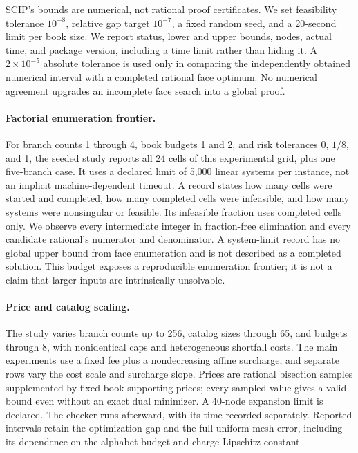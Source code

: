 SCIP's bounds are numerical, not rational proof certificates. We set feasibility tolerance $10^{-8}$, relative gap target $10^{-7}$, a fixed random seed, and a 20-second limit per book size. We report status, lower and upper bounds, nodes, actual time, and package version, including a time limit rather than hiding it. A $2\times10^{-5}$ absolute tolerance is used only in comparing the independently obtained numerical interval with a completed rational face optimum. No numerical agreement upgrades an incomplete face search into a global proof.

\paragraph{Factorial enumeration frontier.}
For branch counts 1 through 4, book budgets 1 and 2, and risk tolerances 0, $1/8$, and 1, the seeded study reports all 24 cells of this experimental grid, plus one five-branch case. It uses a declared limit of 5,000 linear systems per instance, not an implicit machine-dependent timeout. A record states how many cells were started and completed, how many completed cells were infeasible, and how many systems were nonsingular or feasible. Its infeasible fraction uses completed cells only. We observe every intermediate integer in fraction-free elimination and every candidate rational's numerator and denominator. A system-limit record has no global upper bound from face enumeration and is not described as a completed solution. This budget exposes a reproducible enumeration frontier; it is not a claim that larger inputs are intrinsically unsolvable.

\paragraph{Price and catalog scaling.}
The study varies branch counts up to 256, catalog sizes through 65, and budgets through 8, with nonidentical caps and heterogeneous shortfall costs. The main experiments use a fixed fee plus a nondecreasing affine surcharge, and separate rows vary the cost scale and surcharge slope. Prices are rational bisection samples supplemented by fixed-book supporting prices; every sampled value gives a valid bound even without an exact dual minimizer. A 40-node expansion limit is declared. The checker runs afterward, with its time recorded separately. Reported intervals retain the optimization gap and the full uniform-mesh error, including its dependence on the alphabet budget and charge Lipschitz constant.

